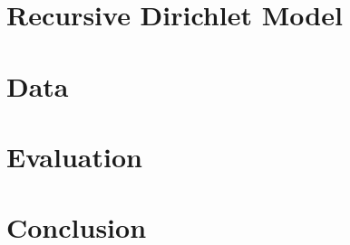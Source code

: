 \documentclass[11pt]{article}
\begin{document}
\section{Recursive Dirichlet Model}\label{method}

\section{Data}\label{sec:data}


\section{Evaluation}\label{sec:evaluation}


\section{Conclusion}\label{sec:conclusion}



\end{document}
